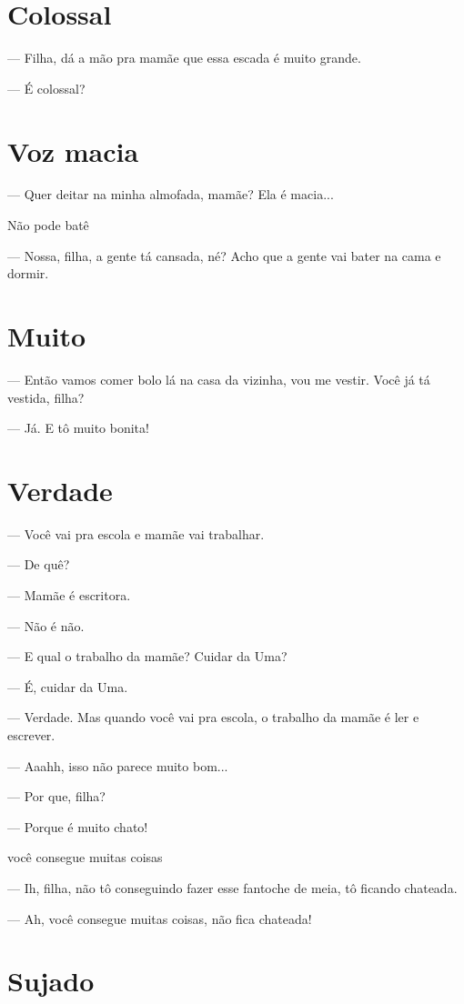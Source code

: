 {\chapter{Colossal}

— Filha, dá a mão pra mamãe que essa escada é muito grande.

— É colossal?

\chapter{Voz macia}

— Quer deitar na minha almofada, mamãe? Ela é macia...

Não pode batê

— Nossa, filha, a gente tá cansada, né? Acho que a gente vai bater na
cama e dormir.

\chapter{Muito}

— Então vamos comer bolo lá na casa da vizinha, vou me vestir. Você já
tá vestida, filha?

— Já. E tô muito bonita!

\chapter{Verdade}

— Você vai pra escola e mamãe vai trabalhar.

— De quê?

— Mamãe é escritora.

— Não é não.

— E qual o trabalho da mamãe? Cuidar da Uma?

— É, cuidar da Uma.

— Verdade. Mas quando você vai pra escola, o trabalho da mamãe é ler e
escrever.

— Aaahh, isso não parece muito bom...

— Por que, filha?

— Porque é muito chato!

você consegue muitas coisas

— Ih, filha, não tô conseguindo fazer esse fantoche de meia, tô ficando
chateada.

— Ah, você consegue muitas coisas, não fica chateada!

\chapter{Sujado}

}
